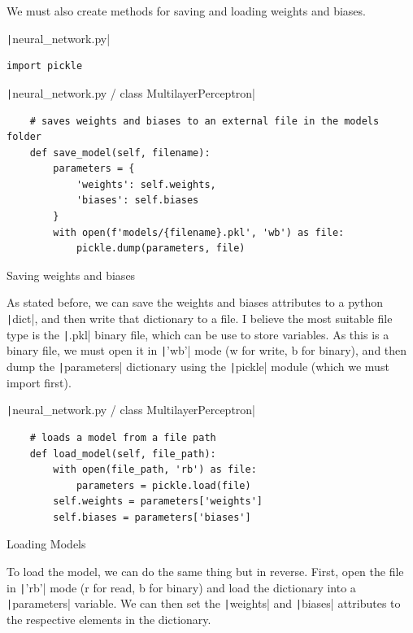 \documentclass[12pt]{report}
\newcommand{\pil}[1]{\protect\texttt|#1|}
\begin{document}
We must also create methods for saving and loading weights and biases.

\begin{listing}[H]
\pil{neural_network.py}
\begin{verbatim}
import pickle
\end{verbatim}
\pil{neural_network.py / class MultilayerPerceptron}
\begin{verbatim}
    # saves weights and biases to an external file in the models folder
    def save_model(self, filename):
        parameters = {
            'weights': self.weights,
            'biases': self.biases
        }
        with open(f'models/{filename}.pkl', 'wb') as file:
            pickle.dump(parameters, file)
\end{verbatim}
\caption{Saving weights and biases}\label{cs:savingModels}
\end{listing}

As stated before, we can save the weights and biases attributes to a python \pil{dict}, and then write that dictionary to a file. I believe the most suitable file type is the \pil{.pkl} binary file, which can be use to store variables. As this is a binary file, we must open it in \pil{'wb'} mode (w for write, b for binary), and then dump the \pil{parameters} dictionary using the \pil{pickle} module (which we must import first).

\begin{listing}[H]
\pil{neural_network.py / class MultilayerPerceptron}
\begin{verbatim}
    # loads a model from a file path
    def load_model(self, file_path):
        with open(file_path, 'rb') as file:
            parameters = pickle.load(file)
        self.weights = parameters['weights']
        self.biases = parameters['biases']
\end{verbatim}
\caption{Loading Models}\label{cs:loadingModels}
\end{listing}

To load the model, we can do the same thing but in reverse. First, open the file in \pil{'rb'} mode (r for read, b for binary) and load the dictionary into a \pil{parameters} variable. We can then set the \pil{weights} and \pil{biases} attributes to the respective elements in the dictionary.
\end{document}

